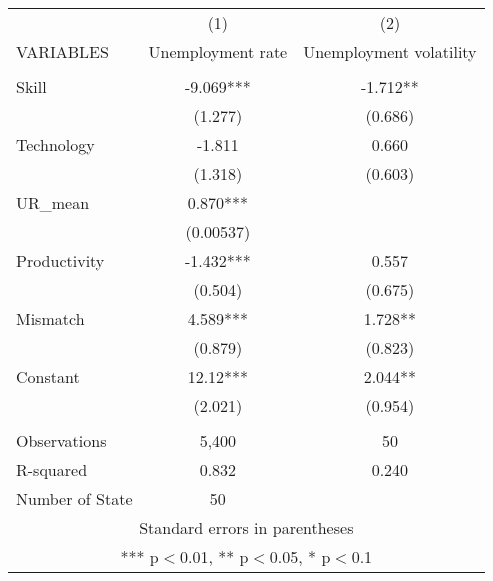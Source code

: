 \documentclass[]{article}
\begin{document}
\begin{tabular}{lcc} \hline
 & (1) & (2) \\
VARIABLES & Unemployment rate & Unemployment volatility \\ \hline
 &  &  \\
Skill & -9.069*** & -1.712** \\
 & (1.277) & (0.686) \\
Technology & -1.811 & 0.660 \\
 & (1.318) & (0.603) \\
UR\_mean & 0.870*** &  \\
 & (0.00537) &  \\
Productivity & -1.432*** & 0.557 \\
 & (0.504) & (0.675) \\
Mismatch & 4.589*** & 1.728** \\
 & (0.879) & (0.823) \\
Constant & 12.12*** & 2.044** \\
 & (2.021) & (0.954) \\
 &  &  \\
Observations & 5,400 & 50 \\
R-squared & 0.832 & 0.240 \\
 Number of State & 50 &  \\ \hline
\multicolumn{3}{c}{ Standard errors in parentheses} \\
\multicolumn{3}{c}{ *** p$<$0.01, ** p$<$0.05, * p$<$0.1} \\
\end{tabular}
\end{document}
